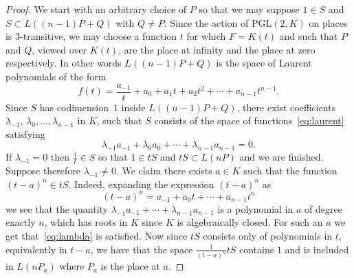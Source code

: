 \documentclass[10pt]{amsart}
\theoremstyle{definition}
\theoremstyle{remark}
\begin{document}
\begin{proof}
We start with an arbitrary choice of $P$ so that we may suppose $1\in S$ and $S\subset L((n-1)P+Q)$ with $Q\neq P$. Since the action of $\mathrm{PGL}(2,K)$ on places is $3$-transitive, we may choose a function $t$ for which $F=K(t)$ and such that $P$ and $Q$, viewed over $K(t)$, are the place at infinity and the place at zero respectively. In other words $L((n-1)P+Q)$ is the space of Laurent polynomials of the form
\begin{equation}\label{eq:laurent}
f(t)=\frac {a_{-1}} t + a_0 + a_1 t + a_2 t^2 + \cdots + a_{n-1} t^{n-1}.
\end{equation}
Since $S$ has codimension~$1$ inside $L((n-1)P+Q)$, there exist coefficients $\lambda_{-1}$, $\lambda_0,\ldots,\lambda_{n-1}$ in $K$, such that $S$ consists of the space of functions~\eqref{eq:laurent} satisfying
\begin{equation}\label{eq:lambda}
\lambda_{-1}a_{-1}+\lambda_0a_0+\cdots + \lambda_{n-1}a_{n-1}=0.
\end{equation}
If $\lambda_{-1}=0$ then $\frac{1}{t}\in S$ so that $1\in tS$ and $tS\subset L(nP)$ and we are finished. Suppose therefore $\lambda_{-1}\neq 0$. We claim there exists $a\in K$ such that the function $(t-a)^n\in tS$. Indeed, expanding the expression $(t-a)^n$ as
\[
(t-a)^n=a_{-1}+a_0t+\cdots +a_{n-1}t^n
\]
we see that the quantity $\lambda_{-1}a_{-1}+\cdots +
\lambda_{n-1}a_{n-1}$ is a polynomial in $a$ of degree exactly $n$, which has roots in $K$ since $K$ is algebraically closed. For such an $a$ we get that~\eqref{eq:lambda} is satisfied. Now since $tS$ consists only of polynomials in $t$, equivalently in $t-a$, we have that the space $\frac 1{(t-a)^n}tS$ contains $1$ and is included in $L(nP_a)$ where $P_a$ is the place at $a$.
\end{proof}
\end{document}
